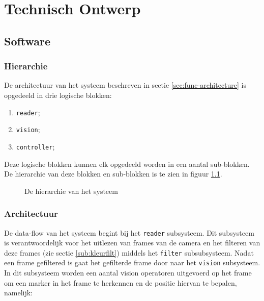 \chapter{Technisch Ontwerp}

\section{Software}
\subsection{Hierarchie}

De architectuur van het \autonerf systeem beschreven in sectie
\ref{sec:func-architecture} is opgedeeld in drie logische blokken:

\begin{enumerate}
    \item \texttt{reader};
    \item \texttt{vision};
    \item \texttt{controller};
\end{enumerate}

Deze logische blokken kunnen elk opgedeeld worden in een aantal sub-blokken.
De hierarchie van deze blokken en sub-blokken is te zien in figuur
\ref{fig:hierarchy}.

\begin{figure}[H]
    \begin{center}
        
    \end{center}
    \caption{De hierarchie van het \autonerf systeem}
    \label{fig:hierarchy}
\end{figure}

\subsection{Architectuur}

De data-flow van het systeem begint bij het \texttt{reader} subsysteem. Dit
subsysteem is verantwoordelijk voor het uitlezen van frames van de camera en
het filteren van deze frames (zie sectie \ref{sub:kleurfilt}) middels het
\texttt{filter} subsubsysteem. Nadat een frame gefiltered is gaat het
gefilterde frame door naar het \texttt{vision} subsysteem. In dit subsysteem
worden een aantal vision operatoren uitgevoerd op het frame om een marker in
het frame te herkennen en de positie hiervan te bepalen, namelijk:

